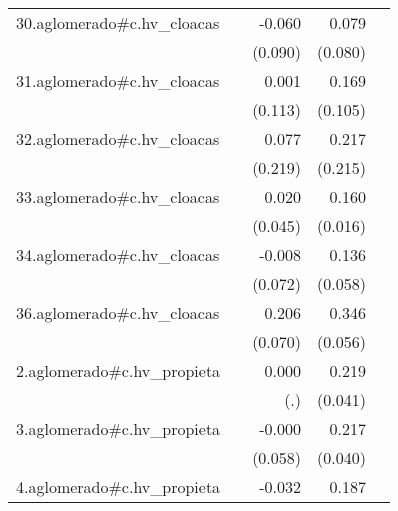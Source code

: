 {\begin{longtable}{l*{4}{D{.}{.}{-1}}}
\addlinespace
30.aglomerado#c.hv\_cloacas&                     &      -0.060         &       0.079         &                     \\
            &                     &     (0.090)         &     (0.080)         &                     \\
\addlinespace
31.aglomerado#c.hv\_cloacas&                     &       0.001         &       0.169         &                     \\
            &                     &     (0.113)         &     (0.105)         &                     \\
\addlinespace
32.aglomerado#c.hv\_cloacas&                     &       0.077         &       0.217         &                     \\
            &                     &     (0.219)         &     (0.215)         &                     \\
\addlinespace
33.aglomerado#c.hv\_cloacas&                     &       0.020         &       0.160\sym{***}&                     \\
            &                     &     (0.045)         &     (0.016)         &                     \\
\addlinespace
34.aglomerado#c.hv\_cloacas&                     &      -0.008         &       0.136\sym{*}  &                     \\
            &                     &     (0.072)         &     (0.058)         &                     \\
\addlinespace
36.aglomerado#c.hv\_cloacas&                     &       0.206\sym{**} &       0.346\sym{***}&                     \\
            &                     &     (0.070)         &     (0.056)         &                     \\
\addlinespace
2.aglomerado#c.hv\_propieta&                     &       0.000         &       0.219\sym{***}&                     \\
            &                     &         (.)         &     (0.041)         &                     \\
\addlinespace
3.aglomerado#c.hv\_propieta&                     &      -0.000         &       0.217\sym{***}&                     \\
            &                     &     (0.058)         &     (0.040)         &                     \\
\addlinespace
4.aglomerado#c.hv\_propieta&                     &      -0.032         &       0.187\sym{***}&                     \\

\end{longtable}}
